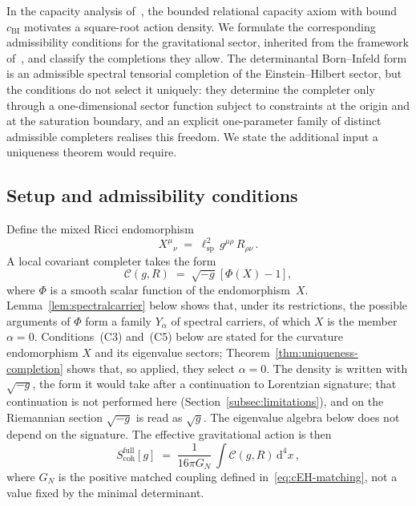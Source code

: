 \documentclass[pdflatex,sn-mathphys-num]{sn-jnl} %
\theoremstyle{remark}
\theoremstyle{plain}
\begin{document}
  In the capacity analysis of~\cite{Beau2026c},
  the bounded relational capacity axiom with bound
  $c_{\mathrm{BI}}$ motivates a
  square-root action density.
  We formulate the corresponding admissibility conditions
  for the gravitational sector, inherited from the
  framework of~\cite{Beau2026m,Beau2026l}, and classify
  the completions they allow.
  The determinantal Born--Infeld form is an admissible
  spectral tensorial completion of the Einstein--Hilbert
  sector, but the conditions do not select it uniquely:
  they determine the completer only through a
  one-dimensional sector function subject to constraints at
  the origin and at the saturation boundary, and an
  explicit one-parameter family of distinct admissible
  completers realises this freedom.
  We state the additional input a uniqueness theorem would
  require.

  \subsection{Setup and admissibility conditions}
    \label{subsec:UV-setup}

    Define the mixed Ricci endomorphism
    \begin{equation}\label{eq:mixed-ricci}
      X^{\mu}{}_{\nu}
      \;=\;
      \ell_{\mathrm{sp}}^{2}\,
      g^{\mu\rho}\, R_{\rho\nu}\,.
    \end{equation}
    A local covariant completer takes the form
    \begin{equation}\label{eq:completer-form}
      \mathcal{C}(g, R)
      \;=\;
      \sqrt{-g}\;\bigl[\,\Phi(X) - 1\,\bigr]\,,
    \end{equation}
    where $\Phi$ is a smooth scalar function of the
    endomorphism~$X$.
    Lemma~\ref{lem:spectralcarrier} below shows that, under its restrictions, the possible arguments of $\Phi$ form
    a family $Y_\alpha$ of spectral carriers, of which $X$ is the member $\alpha = 0$.
    Conditions~(C3) and~(C5) below are stated for the curvature endomorphism $X$ and its eigenvalue sectors;
    Theorem~\ref{thm:uniqueness-completion} shows that, so applied, they select $\alpha = 0$.
    The density is written with $\sqrt{-g}$, the form it would take after a continuation to Lorentzian signature;
    that continuation is not performed here (Section~\ref{subsec:limitations}), and on the Riemannian section
    $\sqrt{-g}$ is read as $\sqrt{g}$.
    The eigenvalue algebra below does not depend on the signature.
    The effective gravitational action is then
    \[
      S_{\mathrm{coh}}^{\mathrm{full}}[g]
      \;=\;
      \frac{1}{16\pi G_N}\,
      \int \mathcal{C}(g, R)\,\mathrm{d}^4 x\,,
    \]
    where $G_N$ is the positive matched coupling defined in~\eqref{eq:cEH-matching}, not a value fixed by the minimal
    determinant.
\end{document}
